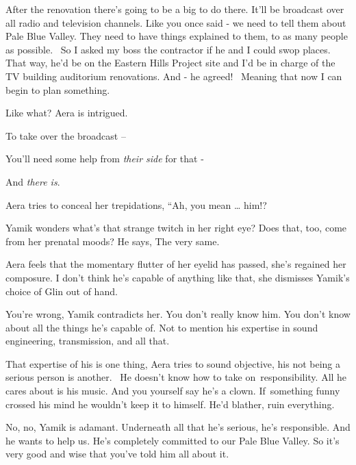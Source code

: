 \documentclass[12pt]{book}
\begin{document}
{\textquotedbl}After the renovation there's going to be a big to do there. It'll be broadcast over all radio and
television channels. Like you once said - we need to tell them about Pale Blue Valley. They need to have things
explained to them, to as many people as possible. \ So I asked my boss the contractor if he and I could swop places.
That way, he'd be on the Eastern Hills Project site and I'd be in charge of the TV building auditorium renovations. And
- he agreed! \ Meaning that now I can begin to plan something.{\textquotedbl}

{\textquotedbl}Like what?{\textquotedbl} Aera is intrigued.

{\textquotedbl}To take over the broadcast --{\textquotedbl}

{\textquotedbl}You'll need some help from \textit{their side }for that -{\textquotedbl}

{\textquotedbl}And \textit{there is}.{\textquotedbl}

Aera tries to conceal her trepidations, ``Ah, you mean {\dots} him!?{\textquotedbl}

Yamik wonders what's that strange twitch in her right eye? Does that, too, come from her prenatal moods? He says,
{\textquotedbl}The very same.{\textquotedbl}

Aera feels that the momentary flutter of her eyelid has passed, she's regained her composure. {\textquotedbl}I don't
think he's capable of anything like that,{\textquotedbl} she dismisses Yamik's choice of Glin out of hand. ~

{\textquotedbl}You're wrong,{\textquotedbl} Yamik contradicts her. {\textquotedbl}You don't really know him. You don't
know about all the things he's capable of. Not to mention his expertise in sound engineering, transmission, and all
that.{\textquotedbl}

{\textquotedbl}That expertise of his is one thing,{\textquotedbl} Aera tries to sound objective, {\textquotedbl}his not
being a serious person is another. \ He doesn't know how to take on~responsibility. All he cares about is his music.
And you yourself say he's a clown. If~something funny crossed his mind he wouldn't keep it to himself. He'd blather,
ruin everything.{\textquotedbl}

{\textquotedbl}No, no,{\textquotedbl} Yamik is adamant. {\textquotedbl}Underneath all that he's serious, he's
responsible. And he wants to help us. He's completely committed to our Pale Blue Valley. So it's very good and wise
that you've told him all about it.{\textquotedbl}
\end{document}
